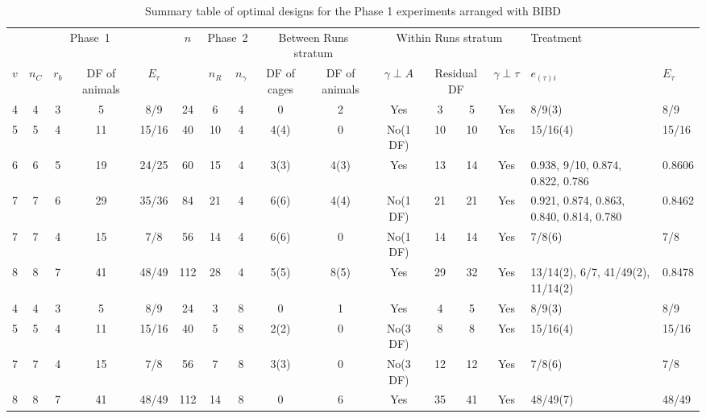 \documentclass[a4paper,11pt]{article}
\begin{document}
\begin{landscape}
\begin{table}[ht]
\centering
 \caption{Summary table of optimal designs for the Phase 1 experiments arranged with BIBD}
\begin{tabular}[t]{|*{14}{c|}p{1.5in}|p{0.5in}|} \hline
\multicolumn{5}{|c|}{Phase~1}  & $n$  & \multicolumn{2}{c|}{Phase~2} & \multicolumn{2}{c|}{Between Runs stratum}  & \multicolumn{4}{c|}{Within Runs stratum} & \multicolumn{2}{p{2in}|}{Treatment} \\ \cline{1-5} \cline{7-16}
$v$ & $n_C$ & $r_b$  &  DF of animals & $E_\tau$ &  & $n_R$ & $n_\gamma$ & DF of cages & DF of animals &  $\gamma \perp A$ & \multicolumn{2}{c|}{Residual DF} & $\gamma \perp \tau$  &  $e_{(\tau)i}$ &$E_\tau$ \\ \hline
4 & 4 & 3  & 5  & 8/9   & 24  & 6 & 4 & 0 & 2 & Yes & 3 & 5 & Yes & 8/9(3) & 8/9 \\ \hline
5 & 5 & 4  & 11 & 15/16 & 40  & 10 & 4  & 4(4) & 0 & No(1 DF) & 10 & 10 & Yes & 15/16(4) & 15/16 \\ \hline
6 & 6 & 5  & 19 & 24/25 & 60  & 15 & 4 & 3(3) & 4(3) & Yes & 13 & 14 & Yes & 0.938, 9/10, 0.874, 0.822, 0.786 & 0.8606 \\ \hline
7 & 7 & 6  & 29 & 35/36 & 84  & 21 & 4 & 6(6) & 4(4) & No(1 DF) & 21 & 21 & Yes & 0.921, 0.874, 0.863, 0.840, 0.814, 0.780 & 0.8462 \\ \hline
7 & 7 & 4  & 15 & 7/8   & 56  & 14 & 4 & 6(6) & 0 & No(1 DF) & 14 & 14 & Yes & 7/8(6) & 7/8 \\ \hline
8 & 8 & 7  & 41 & 48/49 & 112 & 28 & 4 & 5(5) & 8(5) & Yes & 29 & 32 & Yes & 13/14(2),  6/7, 41/49(2), 11/14(2) & 0.8478 \\ \hline
4 & 4 & 3  & 5  & 8/9   & 24  & 3 & 8 & 0 & 1 & Yes & 4 & 5 & Yes & 8/9(3) & 8/9 \\ \hline
5 & 5 & 4  & 11 & 15/16 & 40  & 5 & 8 & 2(2) & 0 & No(3 DF) & 8 & 8 & Yes & 15/16(4) & 15/16 \\ \hline
7 & 7 & 4  & 15 & 7/8   & 56  & 7 & 8 & 3(3) & 0 & No(3 DF) & 12 & 12 & Yes & 7/8(6) & 7/8 \\ \hline
8 & 8 & 7  & 41 & 48/49 & 112 & 14 &8  & 0 & 6 & Yes & 35 & 41 & Yes & 48/49(7) & 48/49 \\ \hline
\end{tabular}
\end{table} 

\end{landscape}
\end{document}

